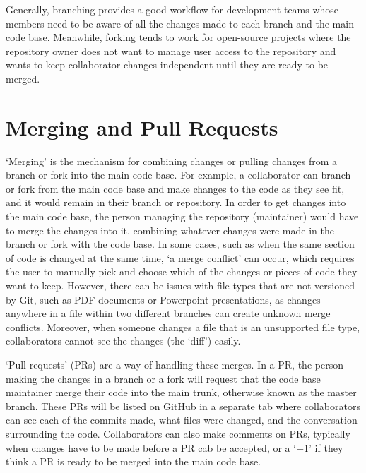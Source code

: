 Generally, branching provides a good workflow for development teams whose members need to be aware of all the changes made to each branch and the main code base. Meanwhile, forking tends to work for open-source projects where the repository owner does not want to manage user access to the repository and wants to keep collaborator changes independent until they are ready to be merged.

\section{Merging and Pull Requests}
`Merging' is the mechanism for combining changes or pulling changes from a branch or fork into the main code base. For example, a collaborator can branch or fork from the main code base and make changes to the code as they see fit, and it would remain in their branch or repository. In order to get changes into the main code base, the person managing the repository (maintainer) would have to merge the changes into it, combining whatever changes were made in the branch or fork with the code base. In some cases, such as when the same section of code is changed at the same time, `a merge conflict' can occur, which requires the user to manually pick and choose which of the changes or pieces of code they want to keep. However, there can be issues with file types that are not versioned by Git, such as PDF documents or Powerpoint presentations, as changes anywhere in a file within two different branches can create unknown merge conflicts. Moreover, when someone changes a file that is an unsupported file type, collaborators cannot see the changes (the `diff') easily.

`Pull requests' (PRs) are a way of handling these merges. In a PR, the person making the changes in a branch or a fork will request that the code base maintainer merge their code into the main trunk, otherwise known as the master branch. These PRs will be listed on GitHub in a separate tab where collaborators can see each of the commits made, what files were changed, and the conversation surrounding the code. Collaborators can also make comments on PRs, typically when changes have to be made before a PR cab be accepted, or a `+1' if they think a PR is ready to be merged into the main code base.

